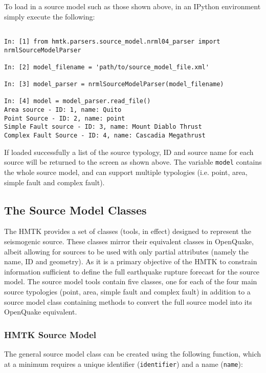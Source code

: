 To load in a source model such as those shown above, in an IPython environment simply execute the following:

\begin{Verbatim}[frame=single, commandchars=\\\{\}, fontsize=\scriptsize, samepage=true]

In: [1] from hmtk.parsers.source_model.nrml04_parser import nrmlSourceModelParser

In: [2] model_filename = 'path/to/source_model_file.xml'

In: [3] model_parser = nrmlSourceModelParser(model_filename)

In: [4] model = model_parser.read_file()
Area source - ID: 1, name: Quito
Point Source - ID: 2, name: point
Simple Fault source - ID: 3, name: Mount Diablo Thrust
Complex Fault Source - ID: 4, name: Cascadia Megathrust

\end{Verbatim}

If loaded successfully a list of the source typology, ID and source name for each source will be returned to the screen as shown above. The variable \verb=model= contains the whole source model, and can support multiple typologies (i.e. point, area, simple fault and complex fault).

\subsection{The Source Model Classes}

The HMTK provides a set of classes (tools, in effect) designed to represent the seismogenic source. These classes mirror their equivalent classes in OpenQuake, albeit allowing for sources to be used with only partial attributes (namely the name, ID and geometry). As it is a primary objective of the HMTK to constrain information sufficient to define the full earthquake rupture forecast for the source model. The source model tools contain five classes, one for each of the four main source typologies (point, area, simple fault and complex fault) in addition to a source model class containing methods to convert the full source model into its OpenQuake equivalent.

\subsubsection{HMTK Source Model}

The general source model class can be created using the following function, which at a minimum requires a unique identifier (\verb=identifier=) and a name (\verb=name=):

